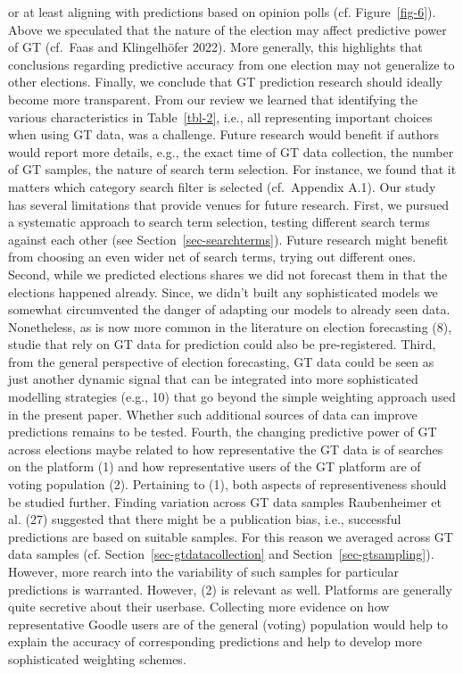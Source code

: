 \documentclass[
  letterpaper,
  DIV=11,
  numbers=noendperiod]{scrartcl}
\begin{document}
or at least aligning with predictions based on opinion polls (cf.
Figure~\ref{fig-6}). Above we speculated that the nature of the election
may affect predictive power of GT (cf.~Faas and Klingelhöfer 2022). More
generally, this highlights that conclusions regarding predictive
accuracy from one election may not generalize to other elections.
Finally, we conclude that GT prediction research should ideally become
more transparent. From our review we learned that identifying the
various characteristics in Table~\ref{tbl-2}, i.e., all representing
important choices when using GT data, was a challenge. Future research
would benefit if authors would report more details, e.g., the exact time
of GT data collection, the number of GT samples, the nature of search
term selection. For instance, we found that it matters which category
search filter is selected (cf.~Appendix A.1). Our study has several
limitations that provide venues for future research. First, we pursued a
systematic approach to search term selection, testing different search
terms against each other (see Section~\ref{sec-searchterms}). Future
research might benefit from choosing an even wider net of search terms,
trying out different ones. Second, while we predicted elections shares
we did not forecast them in that the elections happened already. Since,
we didn't built any sophisticated models we somewhat circumvented the
danger of adapting our models to already seen data. Nonetheless, as is
now more common in the literature on election forecasting (8), studie
that rely on GT data for prediction could also be pre-registered. Third,
from the general perspective of election forecasting, GT data could be
seen as just another dynamic signal that can be integrated into more
sophisticated modelling strategies (e.g., 10) that go beyond the simple
weighting approach used in the present paper. Whether such additional
sources of data can improve predictions remains to be tested. Fourth,
the changing predictive power of GT across elections maybe related to
how representative the GT data is of searches on the platform (1) and
how representative users of the GT platform are of voting population
(2). Pertaining to (1), both aspects of representiveness should be
studied further. Finding variation across GT data samples Raubenheimer
et al. (27) suggested that there might be a publication bias, i.e.,
successful predictions are based on suitable samples. For this reason we
averaged across GT data samples (cf. Section~\ref{sec-gtdatacollection}
and Section~\ref{sec-gtsampling}). However, more rearch into the
variability of such samples for particular predictions is warranted.
However, (2) is relevant as well. Platforms are generally quite
secretive about their userbase. Collecting more evidence on how
representative Goodle users are of the general (voting) population would
help to explain the accuracy of corresponding predictions and help to
develop more sophisticated weighting schemes.
\end{document}
